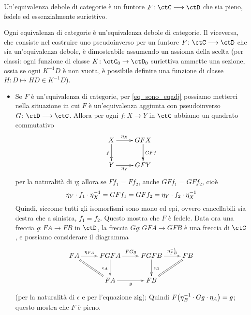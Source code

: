\begin{definition}\label{funtore_wequcat}
 Un'equivalenza debole di categorie è un funtore \(F \colon \ctC \fun\ctD\) che sia pieno, fedele ed essenzialmente suriettivo.
\end{definition}
\begin{remark}\label{eq_implies_weq_AC_eq}
 Ogni equivalenza di categorie è un'equivalenza debole di categorie. Il viceversa, che consiste nel costruire uno pseudoinverso per un funtore \(F \colon \ctC\fun\ctD\) che sia un'equivalenza debole, è dimostrabile assumendo un assioma della scelta (per classi: ogni funzione di classe \(K \colon \ctC_0 \to \ctD_0\) suriettiva ammette una sezione, ossia se ogni \(K^{-1}D\) è non vuota, è possibile definire una funzione di classe \(H \colon D\mapsto HD \in K^{-1}D\)).
 \begin{itemize}
  \item Se \(F\) è un'equivalenza di categorie, per \ref{eq_sono_eqadj} possiamo metterci nella situazione in cui \(F\) è un'equivalenza aggiunta con pseudoinverso \(G \colon \ctD\fun\ctC\). Allora per ogni \(f \colon X\to Y\) in \(\ctC\) abbiamo un quadrato commutativo
        \[\xymatrix{
         X\ar[r]^-{\eta_X}\ar[d]_f & GFX \ar[d]\ar[d]^{GFf}\\
         Y \ar[r]_-{\eta_Y} & GFY
         }\]
        per la naturalità di \(\eta\); allora se \(Ff_1 = Ff_2\), anche \(GFf_1 = GFf_2\), cioè
        \[\eta_Y\cdot f_1 \cdot \eta_X^{-1} = GFf_1 = GFf_2 = \eta_Y\cdot f_2 \cdot \eta_X^{-1}\]
        Quindi, siccome tutti gli isomorfismi sono mono ed epi, ovvero cancellabili sia destra che a sinistra, \(f_1 = f_2\). Questo mostra che \(F\) è fedele. Data ora una freccia \(g \colon FA\to FB\) in \(\ctD\), la freccia \(Gg \colon GFA\to GFB\) è una freccia di \(\ctC\), e possiamo considerare il diagramma
        \[\xymatrix{
         FA \ar@{=}[dr]\ar[r]^-{\eta_{FA}}& FGFA \ar[d]_{\epsilon_A}\ar[r]^-{FGg} & FGFB \ar[d]^{\epsilon_B}\ar[r]^-{\eta_{FB}^{-1}}& FB \\
         & FA \ar[r]_-g& FB \ar@{=}[ur]&
         }\]
        (per la naturalità di \(\epsilon\) e per l'equazione zig); Quindi \(F\big(\eta_B^{-1}\cdot Gg\cdot \eta_A\big) = g\); questo mostra che \(F\) è pieno.


\end{itemize}
\end{remark}

